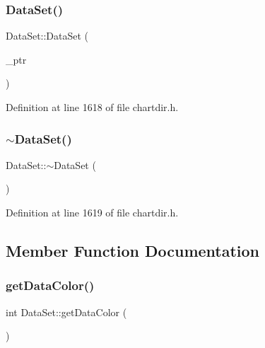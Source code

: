 \subsubsection{\texorpdfstring{Data\+Set()}{DataSet()}}
{\footnotesize\ttfamily Data\+Set\+::\+Data\+Set (\begin{DoxyParamCaption}\item[{Data\+Set\+Internal $\ast$}]{\+\_\+ptr }\end{DoxyParamCaption})\hspace{0.3cm}{\ttfamily [inline]}}



Definition at line 1618 of file chartdir.\+h.

\mbox{\label{class_data_set_a2cdb84d32331956b413ca36933e516bd}} 
\subsubsection{\texorpdfstring{$\sim$\+Data\+Set()}{~DataSet()}}
{\footnotesize\ttfamily Data\+Set\+::$\sim$\+Data\+Set (\begin{DoxyParamCaption}{ }\end{DoxyParamCaption})\hspace{0.3cm}{\ttfamily [inline]}}



Definition at line 1619 of file chartdir.\+h.



\subsection{Member Function Documentation}
\mbox{\label{class_data_set_a7b870af5d707224a3a9953c5362ab0bf}} 
\subsubsection{\texorpdfstring{get\+Data\+Color()}{getDataColor()}}
{\footnotesize\ttfamily int Data\+Set\+::get\+Data\+Color (\begin{DoxyParamCaption}{ }\end{DoxyParamCaption})\hspace{0.3cm}{\ttfamily [inline]}}




